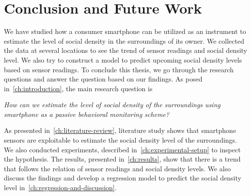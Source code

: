 \chapter{Conclusion and Future Work}
\label{ch:conclusion-future-work} %
We have studied how a consumer smartphone can be utilized as an instrument to estimate the level of social density in the surroundings of its owner. We collected the data at several locations to see the trend of sensor readings and social density level. We also try to construct a model to predict upcoming social density levels based on sensor readings. To conclude this thesis, we go through the research questions and answer the question based on our findings. As posed in~\autoref{ch:introduction}, the main research question is

\begin{displayquote}\textit{
How can we estimate the level of social density of the surroundings using smartphone as a passive behavioral monitoring scheme?}
\end{displayquote}

\noindent
As presented in~\autoref{ch:literature-review}, literature study shows that smartphone sensors are exploitable to estimate the social density level of the surroundings. We also conducted experiments, described in~\autoref{ch:experimental-setup} to inspect the hypothesis. The results, presented in~\autoref{ch:results}, show that there is a trend that follows the relation of sensor readings and social density levels. We also discuss the findings and develop a regression model to predict the social density level in~\autoref{ch:regression-and-discussion}.

